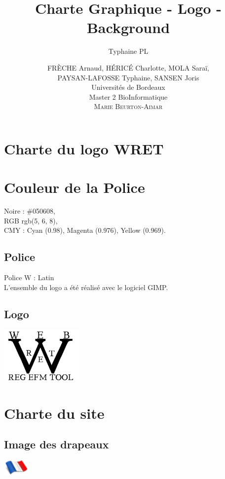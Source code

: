 \documentclass[12pt,a4paper]{article}
\author{Typhaine PL}
\title{Charte Graphique - Logo - Background}
\author{\textsc{FR\`ECHE} Arnaud, \textsc{H\'ERIC\'E} Charlotte, \textsc{MOLA} Saraï,\\ \textsc{PAYSAN-LAFOSSE} Typhaine, \textsc{SANSEN} Joris \\
Universités de Bordeaux\\
Master 2 BioInformatique \\
\textsc{Marie \textsc{Beurton-Aimar}}}
\date{}
\begin{document}
\maketitle


\section{Charte du logo WRET}

\section{Couleur de la Police}
\noindent Noire  : \#050608, \\
RGB	rgb(5, 6, 8), \\
CMY	: Cyan (0.98), Magenta (0.976), Yellow (0.969).\\
  
\subsection{Police}
Police W : Latin \\
L'ensemble du logo a été réalisé avec le logiciel GIMP.

\subsection{Logo}

\begin{center}

\includegraphics[width=0.3\textwidth]{../Images/logo/logo.png}\\
\end{center}

\section{Charte du site}
\subsection{Image des drapeaux}

   \begin{minipage}{0.5\textwidth}
   \includegraphics[width=0.1\textwidth]{../WRET/Images/French-Flag.png}\\

   \end{minipage} 
        
\end{document}
